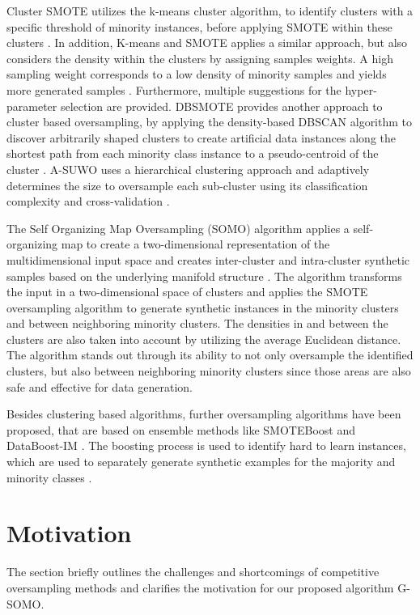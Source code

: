 \documentclass[parskip=full]{scrartcl}
\begin{document}
Cluster SMOTE utilizes the k-means cluster algorithm, to identify clusters with
a specific threshold of minority instances, before applying SMOTE within these
clusters \cite{CieslakCS06}. In addition, K-means and SMOTE applies a similar
approach, but also considers the density within the clusters by assigning
samples weights. A high sampling weight corresponds to a low density of minority
samples and yields more generated samples \cite{Douzas2018}. Furthermore, multiple
suggestions for the hyper-parameter selection are provided. DBSMOTE provides
another approach to cluster based oversampling, by applying the density-based
DBSCAN algorithm to discover arbitrarily shaped clusters to create artificial
data instances along the shortest path from each minority class instance to a
pseudo-centroid of the cluster \cite{Bunkhumpornpat2011}. A-SUWO uses a
hierarchical clustering approach and adaptively determines the size to
oversample each sub-cluster using its classification complexity and
cross-validation \cite{Nekooeimehr2015}. 

The Self Organizing Map Oversampling (SOMO) algorithm applies a self-organizing
map to create a two-dimensional representation of the multidimensional input
space and creates inter-cluster and intra-cluster synthetic samples based on the
underlying manifold structure \cite{Douzas2017B}. The algorithm transforms the
input in a two-dimensional space of clusters and applies the SMOTE oversampling
algorithm to generate synthetic instances in the minority clusters and between
neighboring minority clusters. The densities in and between the clusters are
also taken into account by utilizing the average Euclidean distance. The
algorithm stands out through its ability to not only oversample the identified
clusters, but also between neighboring minority clusters since those areas are
also safe and effective for data generation.  

Besides clustering based algorithms, further oversampling algorithms have been
proposed, that are based on ensemble methods like SMOTEBoost \cite{Chawla2003}
and DataBoost-IM \cite{Guo2004}. The boosting process is used to identify hard
to learn instances, which are used to separately generate synthetic examples for
the majority and minority classes  \cite{Guo2004}.

\section{Motivation}

The section briefly outlines the challenges and shortcomings of competitive
oversampling methods and clarifies the motivation for our proposed algorithm
G-SOMO.
\end{document}
